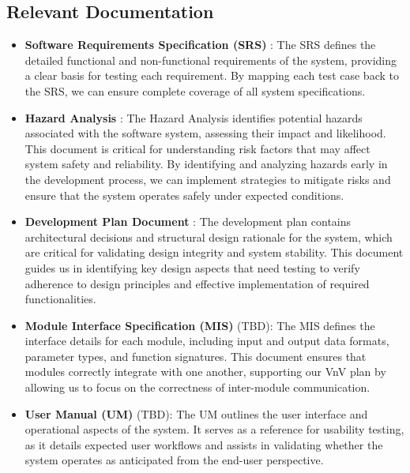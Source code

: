 \documentclass[12pt, titlepage]{article}
\begin{document}
\subsection{Relevant Documentation}

\begin{itemize}
  \item \textbf{Software Requirements Specification (SRS)} \citep{SRS}: The SRS defines the detailed functional and non-functional requirements of the system, providing a clear basis for testing each requirement. By mapping each test case back to the SRS, we can ensure complete coverage of all system specifications. 

  \item \textbf{Hazard Analysis} \citep{Hazard-Analysis}: The Hazard Analysis identifies potential hazards associated with the software system, assessing their impact and likelihood. This document is critical for understanding risk factors that may affect system safety and reliability. By identifying and analyzing hazards early in the development process, we can implement strategies to mitigate risks and ensure that the system operates safely under expected conditions.
 
  \item \textbf{Development Plan Document} \citep{Development-Plan}: The development plan contains architectural decisions and structural design rationale for the system, which are critical for validating design integrity and system stability. This document guides us in identifying key design aspects that need testing to verify adherence to design principles and effective implementation of required functionalities.
 
  \item \textbf{Module Interface Specification (MIS)} (TBD): The MIS defines the interface details for each module, including input and output data formats, parameter types, and function signatures. This document ensures that modules correctly integrate with one another, supporting our VnV plan by allowing us to focus on the correctness of inter-module communication.

  \item \textbf{User Manual (UM)} (TBD): The UM outlines the user interface and operational aspects of the system. It serves as a reference for usability testing, as it details expected user workflows and assists in validating whether the system operates as anticipated from the end-user perspective.
\end{itemize}
\end{document}

